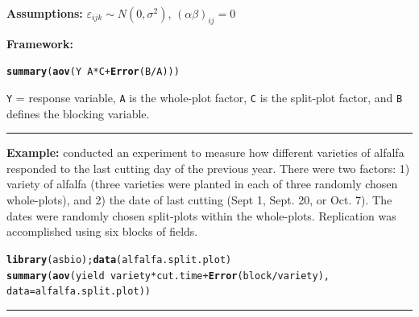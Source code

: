 \documentclass[12pt,english]{article}\usepackage[]{graphicx}\usepackage[table]{xcolor}
\makeatletter
\newcommand{\hlopt}[1]{\textcolor[rgb]{0,0,0}{#1}}%
\newcommand{\hldef}[1]{\textcolor[rgb]{0.345,0.345,0.345}{#1}}%
\newcommand{\hlkwc}[1]{\textcolor[rgb]{0.333,0.667,0.333}{#1}}%
\newcommand{\hlkwd}[1]{\textcolor[rgb]{0.737,0.353,0.396}{\textbf{#1}}}%
\newenvironment{kframe}{%
 \def\at@end@of@kframe{}%
 \ifinner\ifhmode%
  \def\at@end@of@kframe{\end{minipage}}%
  \begin{minipage}{\columnwidth}%
 \fi\fi%
 \def\FrameCommand##1{\hskip\@totalleftmargin \hskip-\fboxsep
 \colorbox{shadecolor}{##1}\hskip-\fboxsep
     \hskip-\linewidth \hskip-\@totalleftmargin \hskip\columnwidth}%
 \MakeFramed {\advance\hsize-\width
   \@totalleftmargin\z@ \linewidth\hsize
   \@setminipage}}%
 {\par\unskip\endMakeFramed%
 \at@end@of@kframe}
\newenvironment{knitrout}{}{} %
\makeatother
\begin{document}
\noindent \textbf{Assumptions:} $\varepsilon_{ijk} \sim N(0, \sigma^2)$, \hspace{0.1in} $(\alpha\beta)_{ij} = 0$
\vspace{0.1in}

\begin{tcolorbox}[colback=yellow!50!red!25!white,colbacktitle=yellow!50!red,colframe=black!75!white,title=\textbf{R:} RBSP]
\textbf{Framework:}\\
\vspace{-.2in}
\begin{knitrout}
\color{fgcolor}\begin{kframe}
\begin{alltt}
\hlkwd{summary}\hldef{(}\hlkwd{aov}\hldef{(Y} \hlopt{~} \hldef{A} \hlopt{*} \hldef{C} \hlopt{+} \hlkwd{Error}\hldef{(B}\hlopt{/}\hldef{A)))}
\end{alltt}
\end{kframe}
\end{knitrout}
\texttt{Y} = response variable, \texttt{A} is the whole-plot factor, \texttt{C} is the split-plot factor, and \texttt{B} defines the blocking variable.
\vspace{0.1in}
\par\noindent\rule{.9\textwidth}{0.4pt}

\textbf{Example:} \citet{snedecor} conducted an experiment to measure how different varieties of alfalfa responded to the last cutting day of the previous year. There were two factors: 1) variety of alfalfa (three varieties were planted in each of three randomly chosen whole-plots), and 2) the date of last cutting (Sept 1, Sept. 20, or Oct. 7). The dates were randomly chosen split-plots within the whole-plots. Replication was accomplished using six blocks of fields.
\vspace{-.1in}
\begin{knitrout}
\color{fgcolor}\begin{kframe}
\begin{alltt}
\hlkwd{library}\hldef{(asbio);} \hlkwd{data}\hldef{(alfalfa.split.plot)}
\hlkwd{summary}\hldef{(}\hlkwd{aov}\hldef{(yield} \hlopt{~} \hldef{variety} \hlopt{*} \hldef{cut.time} \hlopt{+} \hlkwd{Error}\hldef{(block}\hlopt{/}\hldef{variety),}
            \hlkwc{data} \hldef{= alfalfa.split.plot))}
\end{alltt}
\end{kframe}
\end{knitrout}
\end{tcolorbox}
\par\noindent\rule{.9\textwidth}{0.4pt}
\end{document}
